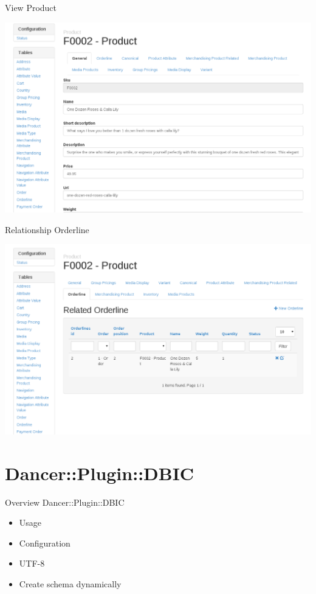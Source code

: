 \begin{frame}{View Product}
  \begin{center}
    \includegraphics[width=\textwidth,height=0.8\textheight,keepaspectratio]{images/product-detail.png}
  \end{center}
\end{frame}

\begin{frame}{Relationship Orderline}
  \begin{center}
    \includegraphics[width=\textwidth,height=0.8\textheight,keepaspectratio]{images/product-related.png}
  \end{center}
\end{frame}

\section{Dancer::Plugin::DBIC}

\begin{frame}{Overview Dancer::Plugin::DBIC}
\begin{itemize}
\item Usage
\item Configuration
\item UTF-8
\item Create schema dynamically
\end{itemize}
\end{frame}

